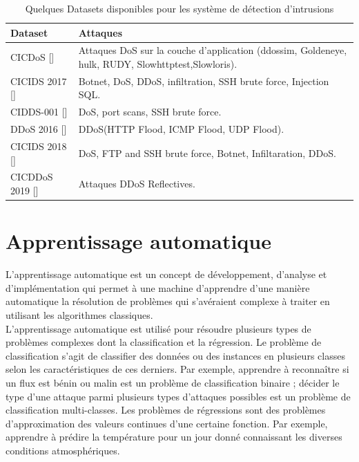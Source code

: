 \begin{table}[h]
\begin{center}
\begin{tabular}{   m{4cm} | m{10cm}  }
\textbf{Dataset} & \textbf{Attaques}\\
\hline
\rowcolor[rgb]{0.85,0.85,0.85}
CICDoS [\cite{13}]  & Attaques DoS sur la couche d'application (ddossim, Goldeneye, hulk, RUDY, Slowhttptest,Slowloris).\\
\hline
CICIDS 2017 [\cite{14}] & Botnet, DoS, DDoS, infiltration, SSH brute force, Injection SQL.\\
\hline
\rowcolor[rgb]{0.85,0.85,0.85}
CIDDS-001 [\cite{15}] & DoS, port scans, SSH brute force.\\
\hline
DDoS 2016 [\cite{16}] & DDoS(HTTP Flood, ICMP Flood, UDP Flood).\\
\hline 
\rowcolor[rgb]{0.85,0.85,0.85}
CICIDS 2018 [\cite{17}] & DoS, FTP and SSH brute force, Botnet, Infiltaration, DDoS.\\
\hline
CICDDoS 2019 [\cite{18}] & Attaques DDoS Reflectives.\\
\hline
\end{tabular}
\caption{Quelques Datasets disponibles pour les système de détection d'intrusions}
\end{center}
\label{table:Datasets}
\end{table}


\newpage
\section{Apprentissage automatique}
L’apprentissage automatique est un concept de développement, d’analyse et d’implémentation qui permet à une machine d’apprendre d’une manière automatique la résolution de problèmes qui s’avéraient complexe à traiter en utilisant les algorithmes classiques.\\

\noindent L’apprentissage automatique est utilisé pour résoudre plusieurs types de problèmes complexes dont la classification et la régression. Le problème de classification s’agit de classifier des données ou des instances en plusieurs classes selon les caractéristiques de ces derniers. Par exemple, apprendre à reconnaître si un flux est bénin ou malin est un problème de classification binaire ; décider le type d’une attaque parmi plusieurs types d’attaques possibles est un problème de classification multi-classes. Les problèmes de régressions sont des problèmes d’approximation des valeurs continues d’une certaine fonction. Par exemple, apprendre à prédire la température pour un jour donné connaissant les diverses conditions atmosphériques.\\


